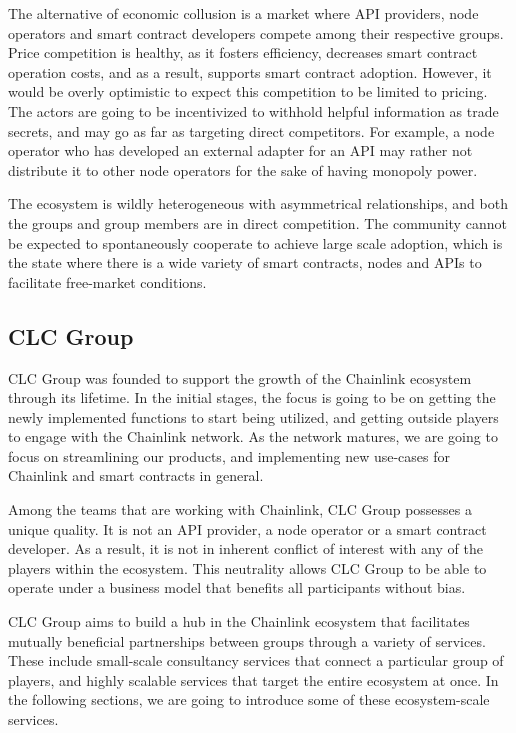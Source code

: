 \documentclass[12pt]{article}
\begin{document}
The alternative of economic collusion is a market where API providers, node operators and smart contract developers compete among their respective groups.
Price competition is healthy, as it fosters efficiency, decreases smart contract operation costs, and as a result, supports smart contract adoption.
However, it would be overly optimistic to expect this competition to be limited to pricing.
The actors are going to be incentivized to withhold helpful information as trade secrets, and may go as far as targeting direct competitors.
For example, a node operator who has developed an external adapter for an API may rather not distribute it to other node operators for the sake of having monopoly power.

The ecosystem is wildly heterogeneous with asymmetrical relationships, and both the groups and group members are in direct competition.
The community cannot be expected to spontaneously cooperate to achieve large scale adoption, which is the state where there is a wide variety of smart contracts, nodes and APIs to facilitate free-market conditions.

\subsection{CLC Group}
\label{sec:clcgroup}

CLC Group was founded to support the growth of the Chainlink ecosystem through its lifetime.
In the initial stages, the focus is going to be on getting the newly implemented functions to start being utilized, and getting outside players to engage with the Chainlink network.
As the network matures, we are going to focus on streamlining our products, and implementing new use-cases for Chainlink and smart contracts in general.

Among the teams that are working with Chainlink, CLC Group possesses a unique quality.
It is not an API provider, a node operator or a smart contract developer.
As a result, it is not in inherent conflict of interest with any of the players within the ecosystem.
This neutrality allows CLC Group to be able to operate under a business model that benefits all participants without bias.

CLC Group aims to build a hub in the Chainlink ecosystem that facilitates mutually beneficial partnerships between groups through a variety of services.
These include small-scale consultancy services that connect a particular group of players, and highly scalable services that target the entire ecosystem at once.
In the following sections, we are going to introduce some of these ecosystem-scale services.
\end{document}
